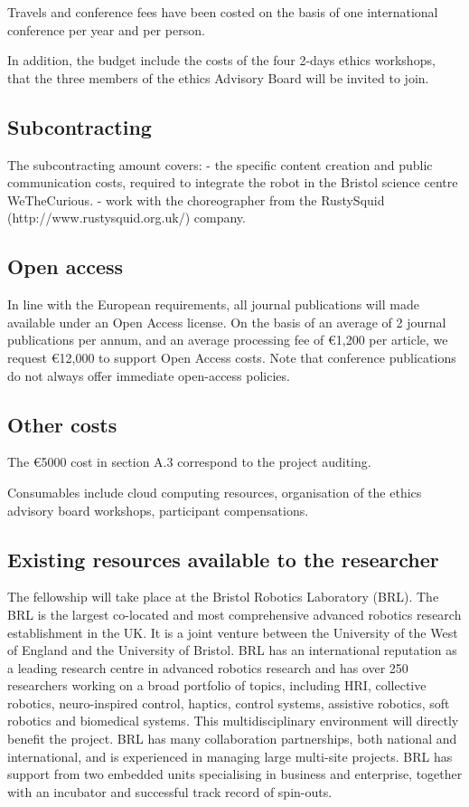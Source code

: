 Travels and conference fees have been costed on the basis of one international
conference per year and per person.

In addition, the budget include the costs of the four 2-days ethics workshops,
that the three members of the ethics Advisory Board will be invited to join.

\subsection{Subcontracting}

The subcontracting amount covers:
- the specific content creation and public communication costs, required to 
integrate the robot in the Bristol science centre WeTheCurious.
- work with the choreographer from the RustySquid
(http://www.rustysquid.org.uk/) company.

\subsection{Open access}

In line with the European requirements, all journal publications will made
available under an Open Access license.  On the basis of an average of 2 journal
publications per annum, and an average processing fee of €1,200 per article, we
request €12,000 to support Open Access costs. Note that conference publications
do not always offer immediate open-access policies.

\subsection{Other costs}

The €5000 cost in section A.3 correspond to the project auditing.

Consumables include cloud computing resources, organisation of 
the ethics advisory board workshops, participant compensations.

\subsection{Existing resources available to the researcher}

The fellowship will take place at the Bristol Robotics Laboratory (BRL). The BRL
is the largest co-located and most comprehensive advanced robotics research
establishment in the UK. It is a joint venture between the University of the
West of England and the University of Bristol.
BRL has an international reputation as a leading research centre in advanced
robotics research and has over 250 researchers working on a broad portfolio of
topics, including HRI, collective robotics, neuro-inspired control,
haptics, control systems, assistive robotics, soft robotics and biomedical
systems. This multidisciplinary environment will directly benefit the
project. BRL has many collaboration partnerships, both national and
international, and is experienced in managing large multi-site projects. BRL has
support from two embedded units specialising in business and enterprise,
together with an incubator and successful track record of spin-outs.

